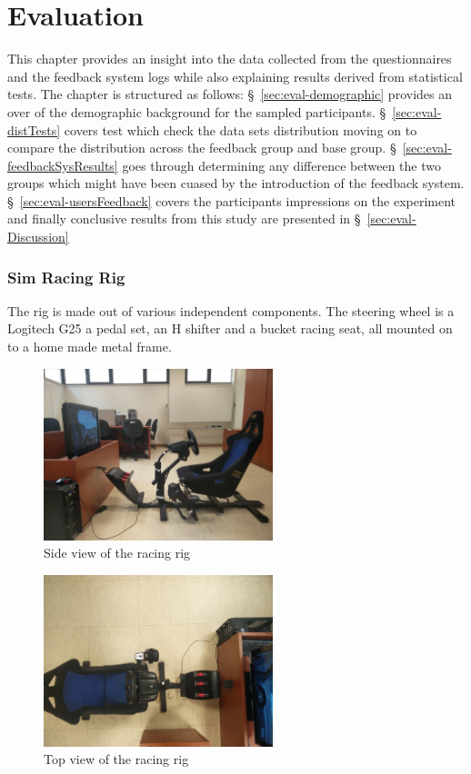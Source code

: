\chapter{Evaluation}
This chapter provides an insight into the data collected from the questionnaires and the feedback system logs while also explaining results derived from statistical tests. The chapter is structured as follows: \S~\ref{sec:eval-demographic} provides an over of the demographic background for the sampled participants. \S~\ref{sec:eval-distTests} covers test which check the data sets distribution moving on to compare the distribution across the feedback group and base group. \S~\ref{sec:eval-feedbackSysResults} goes through determining any difference between the two groups which might have been cuased by the introduction of the feedback system.  \S~\ref{sec:eval-usersFeedback} covers the participants impressions on the experiment and finally conclusive results from this study are presented in \S~\ref{sec:eval-Discussion} 

\subsection{Sim Racing Rig}
\label{sec:imp-simRacingRig}
The rig is made out of various independent components. The steering wheel is a Logitech G25 a pedal set, an H shifter and a bucket racing seat, all mounted on to a home made metal frame.

\begin{figure}[!htb]
	\centering
	\includegraphics[height=5cm]{images/RacingRig}
	\caption{Side view of the racing rig}
	\label{fig:RacingRig}
\end{figure}

\begin{figure}[!htb]
	\centering
	\includegraphics[height=5cm]{images/RacingRig2}
	\caption{Top view of the racing rig}
	\label{fig:RacingRigBirdsEye}
\end{figure}

